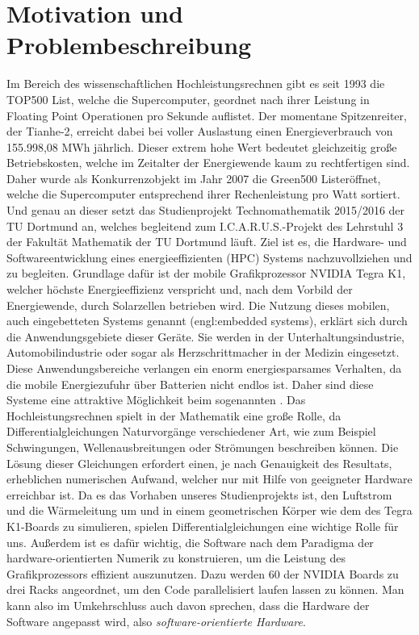 \section{Motivation und Problembeschreibung}
Im Bereich des wissenschaftlichen Hochleistungsrechnen gibt es seit 1993 die \glqq TOP500 List\grqq, welche die Supercomputer, geordnet nach ihrer Leistung in Floating Point Operationen pro Sekunde auflistet. Der momentane Spitzenreiter, der Tianhe-2, erreicht dabei bei voller Auslastung einen Energieverbrauch von 155.998,08 MWh jährlich. Dieser extrem hohe Wert bedeutet gleichzeitig große Betriebskosten, welche im Zeitalter der Energiewende kaum zu rechtfertigen sind. Daher wurde als Konkurrenzobjekt im Jahr 2007 die \glqq Green500 List\grqq eröffnet, welche die Supercomputer entsprechend ihrer Rechenleistung pro Watt sortiert. Und genau an dieser setzt das Studienprojekt Technomathematik 2015/2016 der TU Dortmund an, welches begleitend zum I.C.A.R.U.S.-Projekt des Lehrstuhl 3 der Fakultät Mathematik der TU Dortmund läuft. 
Ziel ist es, die Hardware- und Softwareentwicklung eines energieeffizienten  (HPC) Systems nachzuvollziehen und zu begleiten. Grundlage dafür ist der mobile Grafikprozessor NVIDIA Tegra K1, welcher höchste Energieeffizienz verspricht und, nach dem Vorbild der Energiewende, durch Solarzellen betrieben wird. Die Nutzung dieses mobilen, auch eingebetteten Systems genannt (engl:\glqq embedded systems\grqq), erklärt sich durch die Anwendungsgebiete dieser Geräte. Sie werden in der Unterhaltungsindustrie, Automobilindustrie oder sogar als Herzschrittmacher in der Medizin eingesetzt. Diese Anwendungsbereiche verlangen ein enorm energiesparsames Verhalten, da die mobile Energiezufuhr über Batterien nicht endlos ist. Daher sind diese Systeme eine attraktive Möglichkeit beim sogenannten .
Das Hochleistungsrechnen spielt in der Mathematik eine große Rolle, da Differentialgleichungen Naturvorgänge verschiedener Art, wie zum Beispiel Schwingungen, Wellenausbreitungen oder Strömungen beschreiben können. Die Lösung dieser Gleichungen erfordert einen, je nach Genauigkeit des Resultats, erheblichen numerischen Aufwand, welcher nur mit Hilfe von geeigneter Hardware erreichbar ist. Da es das Vorhaben unseres Studienprojekts ist, den Luftstrom und die Wärmeleitung um und in einem geometrischen Körper wie dem des Tegra K1-Boards zu simulieren, spielen Differentialgleichungen eine wichtige Rolle für uns. Außerdem ist es dafür wichtig, die Software nach dem Paradigma der hardware-orientierten Numerik zu konstruieren, um die Leistung des Grafikprozessors effizient auszunutzen. Dazu werden 60 der NVIDIA Boards zu drei Racks angeordnet, um den Code parallelisiert laufen lassen zu können. Man kann also im Umkehrschluss auch davon sprechen, dass die Hardware der Software angepasst wird, also \textit{software-orientierte Hardware}. 
